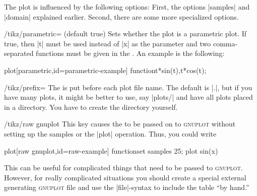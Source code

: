 \begin{codeexample}[]
\end{codeexample}


The plot is influenced by the following options: First, the options
|samples| and |domain| explained earlier. Second, there are some more
specialized options.

\begin{key}{/tikz/parametric= (default true)}
  Sets whether the plot is a parametric plot. If true, then |t| must
  be used instead of |x| as the parameter and two comma-separated
  functions must be given in the . An example is
  the following:
\begin{codeexample}[]
\tikz \draw[scale=0.5,domain=-3.141:3.141,smooth]
  plot[parametric,id=parametric-example] function{t*sin(t),t*cos(t)};
\end{codeexample}
\end{key}


\begin{key}{/tikz/prefix=}
  The  is put before each plot file name. The default is
  |\jobname.|, but
  if you have many plots, it might be better to use, say |plots/| and
  have all plots placed in a directory. You have to create the
  directory yourself.
\end{key}

\begin{key}{/tikz/raw gnuplot}
  This key causes the  to be passed on to
  \textsc{gnuplot} without setting up the samples or the |plot|
  operation. Thus, you could write
\begin{codeexample}
plot[raw gnuplot,id=raw-example] function{set samples 25; plot sin(x)}
\end{codeexample}
  This can be
  useful for complicated things that need to be passed to
  \textsc{gnuplot}. However, for really complicated situations you
  should create a special external generating \textsc{gnuplot} file
  and use the |file|-syntax to include the table ``by hand.''
\end{key}

